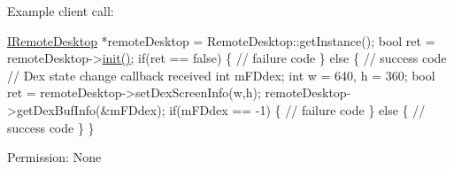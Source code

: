 \-Example client call\-:


\begin{DoxyPre}
  \hyperlink{classknoxremotedesktop_1_1IRemoteDesktop}{IRemoteDesktop} *remoteDesktop = RemoteDesktop::getInstance();
  bool ret = remoteDesktop->\hyperlink{classknoxremotedesktop_1_1IRemoteDesktop_a7bed40d98c61713a69cf1dad8b37beae}{init()};
  if(ret == false)  \{
     // failure code
  \} else \{
     // success code	 
     // Dex state change callback received
     int mFDdex;
     int w = 640, h = 360;
     bool ret = remoteDesktop->setDexScreenInfo(w,h);
     remoteDesktop->getDexBufInfo(&mFDdex);
     if(mFDdex == -1)  \{
         // failure code
     \} else \{
         // success code	 
     \}
  \}
 \end{DoxyPre}


\begin{DoxyParagraph}{\-Permission\-: }
\-None
\end{DoxyParagraph}


